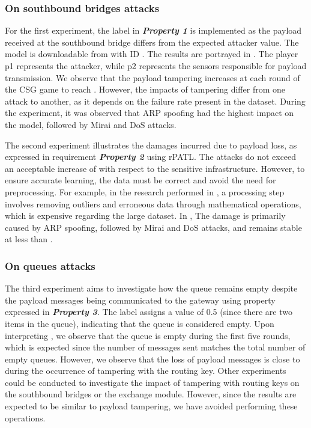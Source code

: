 \subsubsection{On southbound bridges attacks}
For the first experiment, the label   in \emph{\bfseries{Property 1}} is implemented as the payload received at the southbound bridge differs from the expected attacker value. The model is downloadable from \cite{edcc23} with ID . The results are portrayed in . The player p1 represents the attacker, while p2 represents the sensors responsible for payload transmission. We observe that the payload tampering increases at each round of the CSG game to reach . However, the impacts of tampering differ from one attack to another, as it depends on the failure rate present in the dataset. During the experiment, it was observed that ARP spoofing had the highest impact on the model, followed by Mirai and DoS attacks.


The second experiment illustrates the damages incurred due to payload loss, as expressed in requirement \emph{\bfseries{Property 2}} using rPATL. The attacks do not exceed an acceptable increase of  with respect to the sensitive infrastructure. However, to ensure accurate learning, the data must be correct and avoid the need for preprocessing. For example, in the research performed in \cite{Khalid2020}, a processing step involves removing outliers and erroneous data through mathematical operations, which is expensive regarding the large dataset. In , The damage is primarily caused by ARP spoofing, followed by Mirai and DoS attacks, and remains stable at less than .

\subsubsection{On queues attacks}
The third experiment aims to investigate how the queue remains empty despite the payload messages being communicated to the gateway using property expressed in \emph{\bfseries{Property 3}}. The label  assigns a value of 0.5 (since there are two items in the queue), indicating that the queue is considered empty. Upon interpreting , we observe that the queue is  empty during the first five rounds, which is expected since the number of messages sent matches the total number of empty queues. However, we observe that the loss of payload messages is close to  during the occurrence of tampering with the routing key. Other experiments could be conducted to investigate the impact of tampering with routing keys on the southbound bridges or the exchange module. However, since the results are expected to be similar to payload tampering, we have avoided performing these operations.

